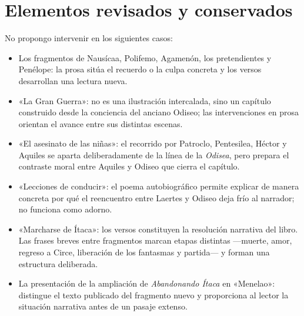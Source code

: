 \documentclass[12pt,a4paper]{article}
\begin{document}
\section*{Elementos revisados y conservados}

No propongo intervenir en los siguientes casos:

\begin{itemize}[leftmargin=*]
  \item Los fragmentos de Nausícaa, Polifemo, Agamenón, los pretendientes y Penélope: la prosa sitúa el recuerdo o la culpa concreta y los versos desarrollan una lectura nueva.
  \item «La Gran Guerra»: no es una ilustración intercalada, sino un capítulo construido desde la conciencia del anciano Odiseo; las intervenciones en prosa orientan el avance entre sus distintas escenas.
  \item «El asesinato de las niñas»: el recorrido por Patroclo, Pentesilea, Héctor y Aquiles se aparta deliberadamente de la línea de la \emph{Odisea}, pero prepara el contraste moral entre Aquiles y Odiseo que cierra el capítulo.
  \item «Lecciones de conducir»: el poema autobiográfico permite explicar de manera concreta por qué el reencuentro entre Laertes y Odiseo deja frío al narrador; no funciona como adorno.
  \item «Marcharse de Ítaca»: los versos constituyen la resolución narrativa del libro. Las frases breves entre fragmentos marcan etapas distintas ---muerte, amor, regreso a Circe, liberación de los fantasmas y partida--- y forman una estructura deliberada.
  \item La presentación de la ampliación de \emph{Abandonando Ítaca} en «Menelao»: distingue el texto publicado del fragmento nuevo y proporciona al lector la situación narrativa antes de un pasaje extenso.
\end{itemize}
\end{document}
